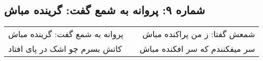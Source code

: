 \begin{center}
\section*{شماره ۹: پروانه به شمع گفت: گرینده مباش}
\label{sec:009}
\begin{longtable}{l p{0.5cm} r}
پروانه به شمع گفت: گرینده مباش
&&
شمعش گفتا: ز من پراکنده مباش
\\
کاتش بسرم چو اشک در پای افتاد
&&
سر میفکنندم که سر افکنده مباش
\\
\end{longtable}
\end{center}
